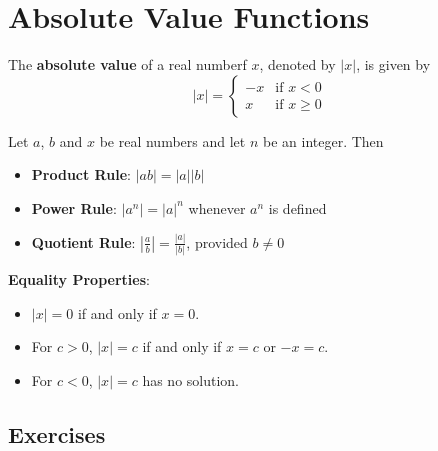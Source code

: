 \section{Absolute Value Functions}

\begin{definition}
    The \textbf{absolute value} of a real numberf $x$, denoted by $|x|$, is given by
    \[|x| = \begin{cases}
            -x & \text{if } x<0     \\
            x  & \text{if } x\geq 0
        \end{cases}
    \]
\end{definition}

\begin{definition}
    Let $a$, $b$ and  $x$ be real numbers and let $n$ be an integer. Then
    \begin{itemize}
        \item \textbf{Product Rule}: $|ab|= |a||b|$
        \item \textbf{Power Rule}: $|a^n| = |a|^n$ whenever $a^n$ is defined
        \item \textbf{Quotient Rule}: $|\frac{a}{b}| = \frac{|a|}{|b|}$, provided $b \neq 0$
    \end{itemize}
    \textbf{Equality Properties}:
    \begin{itemize}
        \item $|x|=0$ if and only if $x=0$.
        \item For $c>0$, $|x|=c$ if and only if $x=c$ or $-x=c$.
        \item For $c<0$, $|x|=c$ has no solution.
    \end{itemize}
\end{definition}

\subsection{Exercises}

